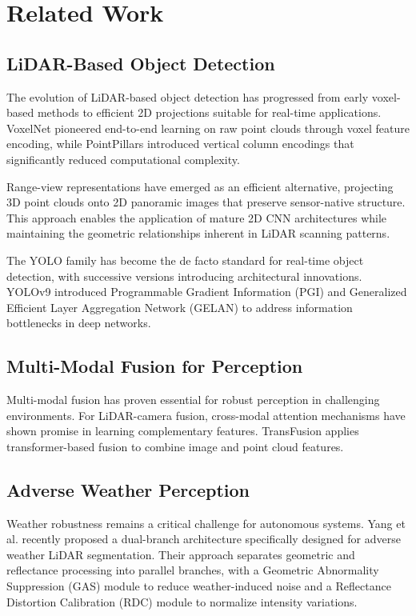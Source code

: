 \documentclass[runningheads]{llncs}
\begin{document}
\section{Related Work}

\subsection{LiDAR-Based Object Detection}

The evolution of LiDAR-based object detection has progressed from early voxel-based methods to efficient 2D projections suitable for real-time applications. VoxelNet \cite{zhou2018voxelnet} pioneered end-to-end learning on raw point clouds through voxel feature encoding, while PointPillars \cite{lang2019pointpillars} introduced vertical column encodings that significantly reduced computational complexity.

Range-view representations have emerged as an efficient alternative, projecting 3D point clouds onto 2D panoramic images that preserve sensor-native structure. This approach enables the application of mature 2D CNN architectures while maintaining the geometric relationships inherent in LiDAR scanning patterns.

The YOLO family has become the de facto standard for real-time object detection, with successive versions introducing architectural innovations. YOLOv9 \cite{wang2024yolov9} introduced Programmable Gradient Information (PGI) and Generalized Efficient Layer Aggregation Network (GELAN) to address information bottlenecks in deep networks.

\subsection{Multi-Modal Fusion for Perception}

Multi-modal fusion has proven essential for robust perception in challenging environments. For LiDAR-camera fusion, cross-modal attention mechanisms have shown promise in learning complementary features. TransFusion \cite{bai2022transfusion} applies transformer-based fusion to combine image and point cloud features.

\subsection{Adverse Weather Perception}

Weather robustness remains a critical challenge for autonomous systems. Yang et al. \cite{yang2025towards} recently proposed a dual-branch architecture specifically designed for adverse weather LiDAR segmentation. Their approach separates geometric and reflectance processing into parallel branches, with a Geometric Abnormality Suppression (GAS) module to reduce weather-induced noise and a Reflectance Distortion Calibration (RDC) module to normalize intensity variations.
\end{document}
